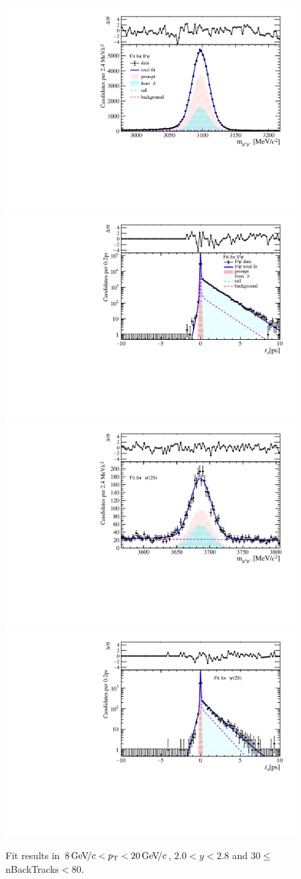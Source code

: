\begin{figure}[H]
\begin{center}
\includegraphics[width=0.47\linewidth]{pdf/Jpsi/drawmassB/n5y1pt5.pdf}
\includegraphics[width=0.47\linewidth]{pdf/Jpsi/2DFitB/n5y1pt5.pdf}
\vspace*{-0.5cm}
\includegraphics[width=0.47\linewidth]{pdf/Psi2S/drawmassB/n5y1pt5.pdf}
\includegraphics[width=0.47\linewidth]{pdf/Psi2S/2DFitB/n5y1pt5.pdf}
\vspace*{-0.5cm}
\end{center}
\caption{Fit results in $8\text{\,Ge\kern -0.1em V\!/}c<p_{\mathrm{T}}<20\text{\,Ge\kern -0.1em V\!/}c$, $2.0<y<2.8$ and 30$\leq$nBackTracks$<$80.}
\label{Fitn5y1pt5}
\end{figure}
